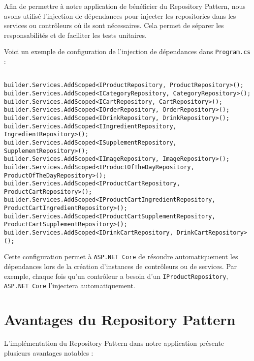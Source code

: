 Afin de permettre à notre application de bénéficier du Repository Pattern, nous avons utilisé l’injection de dépendances pour injecter les repositories dans les services ou contrôleurs où ils sont nécessaires. Cela permet de séparer les responsabilités et de faciliter les tests unitaires.

Voici un exemple de configuration de l’injection de dépendances dans \texttt{Program.cs} :

\begin{lstlisting}[language=CSharp]

builder.Services.AddScoped<IProductRepository, ProductRepository>();
builder.Services.AddScoped<ICategoryRepository, CategoryRepository>();
builder.Services.AddScoped<ICartRepository, CartRepository>();
builder.Services.AddScoped<IOrderRepository, OrderRepository>();
builder.Services.AddScoped<IDrinkRepository, DrinkRepository>();
builder.Services.AddScoped<IIngredientRepository, IngredientRepository>();
builder.Services.AddScoped<ISupplementRepository, SupplementRepository>();
builder.Services.AddScoped<IImageRepository, ImageRepository>();
builder.Services.AddScoped<IProductOfTheDayRepository, ProductOfTheDayRepository>();
builder.Services.AddScoped<IProductCartRepository, ProductCartRepository>();
builder.Services.AddScoped<IProductCartIngredientRepository, ProductCartIngredientRepository>();
builder.Services.AddScoped<IProductCartSupplementRepository, ProductCartSupplementRepository>();
builder.Services.AddScoped<IDrinkCartRepository, DrinkCartRepository>();
\end{lstlisting}

Cette configuration permet à \texttt{ASP.NET Core} de résoudre automatiquement les dépendances lors de la création d'instances de contrôleurs ou de services. Par exemple, chaque fois qu'un contrôleur a besoin d'un \texttt{IProductRepository}, \texttt{ASP.NET Core} l’injectera automatiquement.

\section{Avantages du Repository Pattern}

L’implémentation du Repository Pattern dans notre application présente plusieurs avantages notables :

